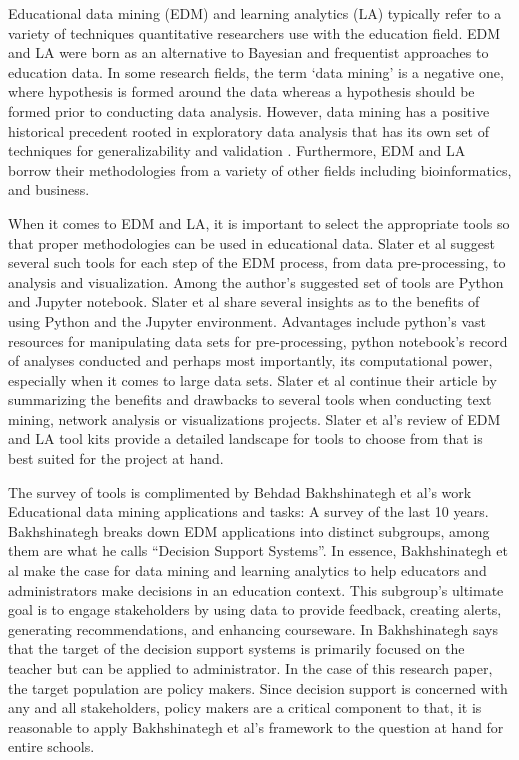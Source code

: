 \documentclass[12pt,a4paper]{article}
\begin{document}
Educational data mining (EDM) and learning analytics (LA) typically refer to a variety of techniques quantitative researchers use with the education field. EDM and LA were born as an alternative to Bayesian and frequentist approaches to education data. In some research fields, the term ‘data mining’ is a negative one, where hypothesis is formed around the data whereas a hypothesis should be formed prior to conducting data analysis. However, data mining has a positive historical precedent rooted in exploratory data analysis that has its own set of techniques for generalizability and validation \cite{behdad}. Furthermore, EDM and LA borrow their methodologies from a variety of other fields including bioinformatics, and business.

When it comes to EDM and LA, it is important to select the appropriate tools so that proper methodologies can be used in educational data. Slater et al suggest several such tools for each step of the EDM process, from data pre-processing, to analysis and visualization. Among the author’s suggested set of tools are Python and Jupyter notebook. Slater et al share several insights as to the benefits of using Python and the Jupyter environment. Advantages include python’s vast resources for manipulating data sets for pre-processing, python notebook’s record of analyses conducted and perhaps most importantly, its computational power, especially when it comes to large data sets. Slater et al continue their article by summarizing the benefits and drawbacks to several tools when conducting text mining, network analysis or visualizations projects. Slater et al’s review of EDM and LA tool kits provide a detailed landscape for tools to choose from that is best suited for the project at hand.

The survey of tools is complimented by Behdad Bakhshinategh et al’s work Educational data mining applications and tasks: A survey of the last 10 years. Bakhshinategh breaks down EDM applications into distinct subgroups, among them are what he calls “Decision Support Systems”. In essence, Bakhshinategh et al make the case for data mining and learning analytics to help educators and administrators make decisions in an education context. This subgroup’s ultimate goal is to engage stakeholders by using data to provide feedback, creating alerts, generating recommendations, and enhancing courseware. In Bakhshinategh says that the target of the decision support systems is primarily focused on the teacher but can be applied to administrator. In the case of this research paper, the target population are policy makers. Since decision support is concerned with any and all stakeholders, policy makers are a critical component to that, it is reasonable to apply Bakhshinategh et al's framework to the question at hand for entire schools. 
\end{document}
